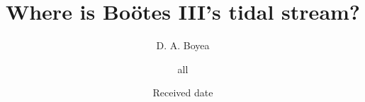 \documentclass{aa}
\begin{document}


   \title{Where is Bo\"otes III's tidal stream?}


%
%
%

   \author{D. A. Boyea        %
       \and all
        }


   \date{Received date}

 
\end{document}
